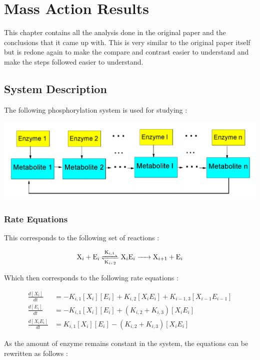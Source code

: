 \chapter*{Mass Action Results}

This chapter contains all the analysis done 
in the original paper and the conclusions that 
it came up with. This is very similar to the original 
paper itself but is redone again to make the compare 
and contrast easier to understand and make the steps 
followed easier to understand.

\section*{System Description}
The following phosphorylation system is used for studying :

\begin{center}
    \includegraphics[scale=0.3]{img/orig-sys.png}
\end{center}

\subsection*{Rate Equations}
\noindent This corresponds to the following set of reactions :

$$ \ce{X_i + E_i <=>[K_{i,1}][K_i,2] X_iE_i -> X_{i+1} + E_i}$$

\noindent Which then corresponds to the following rate equations :

\begin{align*}
    \frac{d[X_i]}{dt} &= -K_{i,1}[X_i][E_i] + K_{i,2}[X_iE_i] + K_{i-1,3}[X_{i-1}E_{i-1}]\\
    \frac{d[E_i]}{dt} &= -K_{i,1}[X_i][E_i] + (K_{i,2} + K_{i,3})[X_iE_i]\\
    \frac{d[X_iE_i]}{dt} &= K_{i,1}[X_i][E_i] - (K_{i,2} + K_{i,3})[X_iE_i]
\end{align*}

\noindent As the amount of enzyme remains constant in the 
system, the equations can be rewritten as follows :


